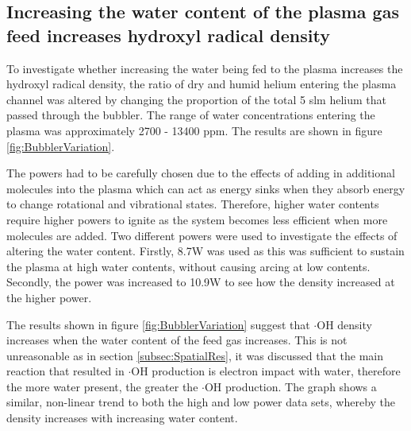 \documentclass[11pt, oneside]{article}   	%
\begin{document}
\subsection{Increasing the water content of the plasma gas feed increases hydroxyl radical density}

To investigate whether increasing the water being fed to the plasma increases the hydroxyl radical density, the ratio of dry and humid helium entering the plasma channel was altered by changing the proportion of the total 5 slm helium that passed through the bubbler. The range of water concentrations entering the plasma was approximately 2700 - 13400 ppm. The results are shown in figure \ref{fig:BubblerVariation}.

The powers had to be carefully chosen due to the effects of adding in additional molecules into the plasma which can act as energy sinks when they absorb energy to change rotational and vibrational states. 
Therefore, higher water contents require higher powers to ignite as the system becomes less efficient when more molecules are added.
Two different powers were used to investigate the effects of altering the water content. Firstly, 8.7W was used as this was sufficient to sustain the plasma at high water contents, without causing arcing at low contents. Secondly, the power was increased to 10.9W to see how the density increased at the higher power. 

The results shown in figure \ref{fig:BubblerVariation} suggest that $\cdot$OH density increases when the water content of the feed gas increases. This is not unreasonable as in section \ref{subsec:SpatialRes}, it was discussed that the main reaction that resulted in $\cdot$OH production is electron impact with water, therefore the more water present, the greater the $\cdot$OH production.
The graph shows a similar, non-linear trend to both the high and low power data sets, whereby the density increases with increasing water content.
\end{document}
